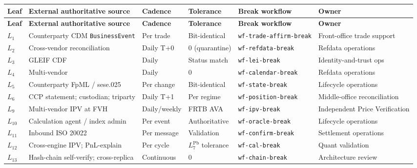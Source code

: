 \documentclass[11pt,a4paper]{article}
\begin{document}
\begin{center}
\renewcommand{\arraystretch}{1.10}
\begin{longtable}{@{}p{1.0cm}p{4.4cm}p{1.7cm}p{2.4cm}p{2.6cm}p{3.2cm}@{}}
\toprule
\textbf{Leaf} & \textbf{External authoritative source} & \textbf{Cadence} & \textbf{Tolerance} & \textbf{Break workflow} & \textbf{Owner} \\
\midrule
\endfirsthead
\toprule
\textbf{Leaf} & \textbf{External authoritative source} & \textbf{Cadence} & \textbf{Tolerance} & \textbf{Break workflow} & \textbf{Owner} \\
\midrule
\endhead
\bottomrule
\endfoot
$L_1$    & Counterparty CDM \texttt{BusinessEvent}     & Per trade   & Bit-identical  & \texttt{wf-trade-affirm-break} & Front-office trade support \\
$L_2$    & Cross-vendor reconciliation                  & Daily T+0   & 0 (quarantine) & \texttt{wf-refdata-break}      & Refdata operations \\
$L_3$    & GLEIF CDF                                    & Daily       & Status match   & \texttt{wf-lei-break}          & Identity-and-trust ops \\
$L_4$    & Multi-vendor                                 & Daily       & 0              & \texttt{wf-calendar-break}     & Refdata operations \\
$L_5$    & Counterparty FpML / sese.025                 & Per change  & Bit-identical  & \texttt{wf-state-break}        & Lifecycle operations \\
$L_6$    & CCP statement; custodian; triparty           & Daily T+1   & Per regime     & \texttt{wf-position-break}     & Middle-office reconciliation \\
$L_9$    & Multi-vendor IPV at FVH                      & Daily/weekly& FRTB AVA       & \texttt{wf-ipv-break}          & Independent Price Verification \\
$L_{10}$ & Calculation agent / index admin              & Per event   & Authoritative  & \texttt{wf-oracle-break}       & Lifecycle operations \\
$L_{11}$ & Inbound ISO 20022                            & Per message & Validation     & \texttt{wf-confirm-break}      & Settlement operations \\
$L_{12}$ & Cross-engine IPV; PnL-explain                & Per cycle   & $L_7^{\mathrm{Pb}}$ tolerance & \texttt{wf-cal-break} & Quant validation \\
$L_{13}$ & Hash-chain self-verify; cross-replica        & Continuous  & 0              & \texttt{wf-chain-break}        & Architecture review \\

\end{longtable}
\end{center}
\end{document}
